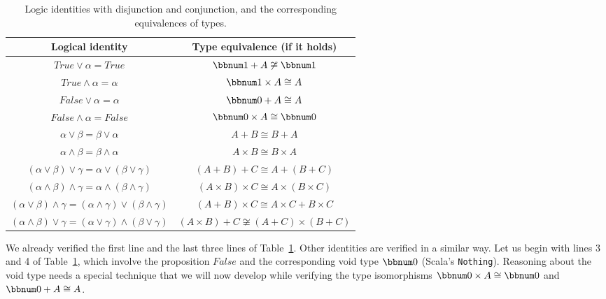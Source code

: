 \begin{table}
\begin{centering}
\begin{tabular}{|c|c|}
\hline 
\textbf{\small{}Logical identity} & \textbf{\small{}Type equivalence (if it holds)}\tabularnewline
\hline 
\hline 
{\small{}$True\vee\alpha=True$} & {\small{}$\bbnum 1+A\not\cong\bbnum 1$}\tabularnewline
\hline 
{\small{}$True\wedge\alpha=\alpha$} & {\small{}$\bbnum 1\times A\cong A$}\tabularnewline
\hline 
{\small{}$False\vee\alpha=\alpha$} & {\small{}$\bbnum 0+A\cong A$}\tabularnewline
\hline 
{\small{}$False\wedge\alpha=False$} & {\small{}$\bbnum 0\times A\cong\bbnum 0$}\tabularnewline
\hline 
{\small{}$\alpha\vee\beta=\beta\vee\alpha$} & {\small{}$A+B\cong B+A$}\tabularnewline
\hline 
{\small{}$\alpha\wedge\beta=\beta\wedge\alpha$} & {\small{}$A\times B\cong B\times A$}\tabularnewline
\hline 
{\small{}$\left(\alpha\vee\beta\right)\vee\gamma=\alpha\vee\left(\beta\vee\gamma\right)$} & {\small{}$\left(A+B\right)+C\cong A+\left(B+C\right)$}\tabularnewline
\hline 
{\small{}$\left(\alpha\wedge\beta\right)\wedge\gamma=\alpha\wedge\left(\beta\wedge\gamma\right)$} & {\small{}$\left(A\times B\right)\times C\cong A\times\left(B\times C\right)$}\tabularnewline
\hline 
{\small{}$\left(\alpha\vee\beta\right)\wedge\gamma=\left(\alpha\wedge\gamma\right)\vee\left(\beta\wedge\gamma\right)$} & {\small{}$\left(A+B\right)\times C\cong A\times C+B\times C$}\tabularnewline
\hline 
{\small{}$\left(\alpha\wedge\beta\right)\vee\gamma=\left(\alpha\vee\gamma\right)\wedge\left(\beta\vee\gamma\right)$} & {\small{}$\left(A\times B\right)+C\not\cong\left(A+C\right)\times\left(B+C\right)$}\tabularnewline
\hline 
\end{tabular}
\par\end{centering}
\caption{Logic identities with disjunction and conjunction, and the corresponding
equivalences of types.\label{tab:Logical-identities-with-disjunction-and-conjunction}}
\end{table}

We already verified the first line and the last three lines of Table~\ref{tab:Logical-identities-with-disjunction-and-conjunction}.
Other identities are verified in a similar way. Let us begin with
lines 3 and 4 of Table~\ref{tab:Logical-identities-with-disjunction-and-conjunction},
which involve the proposition $False$ and the corresponding void
type $\bbnum 0$ (Scala\textsf{'}s \lstinline!Nothing!). Reasoning about the
void type needs a special technique that we will now develop while
verifying the type isomorphisms $\bbnum 0\times A\cong\bbnum 0$ and
$\bbnum 0+A\cong A$.

